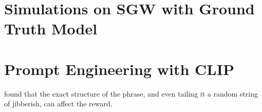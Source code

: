 
\section{Simulations on SGW with Ground Truth Model}

\section{Prompt Engineering with CLIP}
\label{sec:prompt-engineering-experiments}
\cite{waffleclip} found that the exact structure of the phrase, and even tailing it a random string of jibberish, can affect the reward. 
